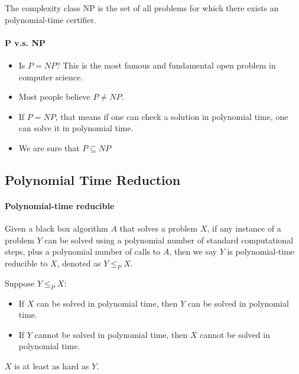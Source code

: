                     \begin{definition}[class NP]
                        The complexity class NP is the set of all problems for which there exists an polynomial-time certifier.
                    \end{definition}

                \paragraph{P v.s. NP}
                    \begin{itemize}
                        \item Is $P = NP?$ This is the most famous and fundamental open problem in computer science.
                        \item Most people believe $P \neq NP$.
                        \item If $P = NP$, that means if one can check a solution in polynomial time, one can solve it in polynomial time.
                        \item We are sure that $P \subseteq NP$
                    \end{itemize}

            \subsection{Polynomial Time Reduction}
                \paragraph{Polynomial-time reducible} Given a black box algorithm $A$ that solves a problem $X$, if any instance of a problem $Y$ can be solved using a polynomial number of standard computational steps, plus a polynomial number of calls to $A$, then we say $Y$ is polynomial-time reducible to $X$, denoted as $Y \le_P X$.

                Suppose $Y \le_P X$:
                \begin{itemize}
                    \item If $X$ can be solved in polynomial time, then $Y$ can be solved in polynomial time.
                    \item If $Y$ cannot be solved in polynomial time, then $X$ cannot be solved in polynomial time.
                \end{itemize}

                $X$ is at least as hard as $Y$.

